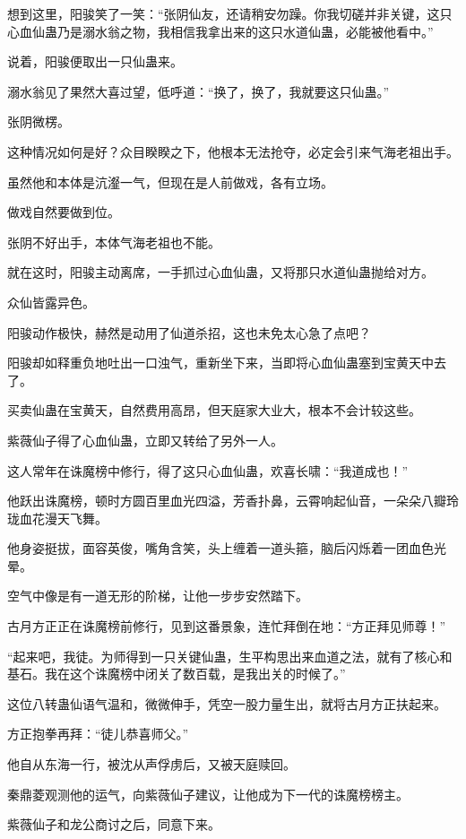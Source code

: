\begin{this_body}
想到这里，阳骏笑了一笑：“张阴仙友，还请稍安勿躁。你我切磋并非关键，这只心血仙蛊乃是溺水翁之物，我相信我拿出来的这只水道仙蛊，必能被他看中。”

说着，阳骏便取出一只仙蛊来。

溺水翁见了果然大喜过望，低呼道：“换了，换了，我就要这只仙蛊。”

张阴微楞。

这种情况如何是好？众目睽睽之下，他根本无法抢夺，必定会引来气海老祖出手。

虽然他和本体是沆瀣一气，但现在是人前做戏，各有立场。

做戏自然要做到位。

张阴不好出手，本体气海老祖也不能。

就在这时，阳骏主动离席，一手抓过心血仙蛊，又将那只水道仙蛊抛给对方。

众仙皆露异色。

阳骏动作极快，赫然是动用了仙道杀招，这也未免太心急了点吧？

阳骏却如释重负地吐出一口浊气，重新坐下来，当即将心血仙蛊塞到宝黄天中去了。

买卖仙蛊在宝黄天，自然费用高昂，但天庭家大业大，根本不会计较这些。

紫薇仙子得了心血仙蛊，立即又转给了另外一人。

这人常年在诛魔榜中修行，得了这只心血仙蛊，欢喜长啸：“我道成也！”

他跃出诛魔榜，顿时方圆百里血光四溢，芳香扑鼻，云霄响起仙音，一朵朵八瓣玲珑血花漫天飞舞。

他身姿挺拔，面容英俊，嘴角含笑，头上缠着一道头箍，脑后闪烁着一团血色光晕。

空气中像是有一道无形的阶梯，让他一步步安然踏下。

古月方正正在诛魔榜前修行，见到这番景象，连忙拜倒在地：“方正拜见师尊！”

“起来吧，我徒。为师得到一只关键仙蛊，生平构思出来血道之法，就有了核心和基石。我在这个诛魔榜中闭关了数百载，是我出关的时候了。”

这位八转蛊仙语气温和，微微伸手，凭空一股力量生出，就将古月方正扶起来。

方正抱拳再拜：“徒儿恭喜师父。”

他自从东海一行，被沈从声俘虏后，又被天庭赎回。

秦鼎菱观测他的运气，向紫薇仙子建议，让他成为下一代的诛魔榜榜主。

紫薇仙子和龙公商讨之后，同意下来。


\end{this_body}
